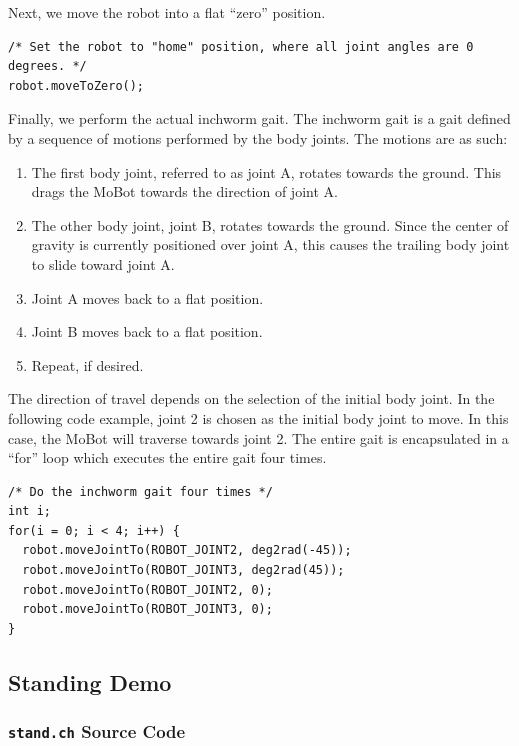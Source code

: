 \documentclass{article}
\begin{document}
Next, we move the robot into a flat ``zero'' position.

\begin{verbatim}
/* Set the robot to "home" position, where all joint angles are 0 degrees. */
robot.moveToZero();
\end{verbatim}

Finally, we perform the actual inchworm gait. The inchworm gait is a gait defined
by a sequence of motions performed by the body joints. The motions are as such:
\begin{enumerate}
\item The first body joint, referred to as joint A, rotates towards the ground.
This drags the MoBot towards the direction of joint A.
\item The other body joint, joint B, rotates towards the ground. Since the center
of gravity is currently positioned over joint A, this causes the trailing body 
joint to slide toward joint A.
\item Joint A moves back to a flat position.
\item Joint B moves back to a flat position.
\item Repeat, if desired.
\end{enumerate}
The direction of travel depends on the selection of the initial body joint. In
the following code example, joint 2 is chosen as the initial body joint to move.
In this case, the MoBot will traverse towards joint 2. The entire gait is
encapsulated in a ``for'' loop which executes the entire gait four times.
\begin{verbatim}
/* Do the inchworm gait four times */
int i;
for(i = 0; i < 4; i++) {
  robot.moveJointTo(ROBOT_JOINT2, deg2rad(-45));
  robot.moveJointTo(ROBOT_JOINT3, deg2rad(45));
  robot.moveJointTo(ROBOT_JOINT2, 0);
  robot.moveJointTo(ROBOT_JOINT3, 0);
}
\end{verbatim}

\subsection{Standing Demo}
\subsubsection{\texttt{stand.ch} Source Code}

\end{document}

